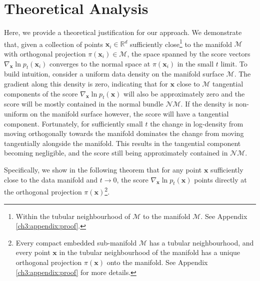 \section{Theoretical Analysis}
\label{ch3:sec:theory}

Here, we provide a theoretical justification for our approach. We demonstrate that, given a collection of points \(\textbf{x}_i \in \mathbb{R}^d\) sufficiently close\footnote{Within the tubular neighbourhood of \(\mathcal{M}\) to the manifold \(\mathcal{M}\). See Appendix \ref{ch3:appendix:proof}.} to the manifold \(\mathcal{M}\) with orthogonal projection \(\pi(\textbf{x}_i) \in \mathcal{M}\), the space spanned by the score vectors \(\nabla_{\textbf{x}} \ln p_t(\textbf{x}_i)\) converges to the normal space at \(\pi(\textbf{x}_i)\) in the small \(t\) limit. To build intuition, consider a uniform data density on the manifold surface $\mathcal{M}$. The gradient along this density is zero, indicating that for $\textbf{x}$ close to  $\mathcal{M}$ tangential components of the score $\nabla_\textbf{x} \ln p_t(\textbf{x})$ will also be approximately zero and the score  will be mostly contained in the normal bundle $\mathcal{NM}$. If the density is non-uniform on the manifold surface however, the score will have a tangential component. Fortunately, for sufficiently small $t$ the change in log-density from moving orthogonally towards the manifold  dominates the change from moving tangentially alongside the manifold. This results in the tangential component becoming negligible, and the score still being approximately contained in $\mathcal{NM}$.

Specifically, we show in the following theorem that for any point $\textbf{x}$ sufficiently close to the data manifold and $t\to 0$, the score $\nabla_\textbf{x} \ln p_t(\textbf{x})$ points directly at the orthogonal projection $\pi(\textbf{x})$\footnote{Every compact embedded sub-manifold $\mathcal{M}$ has a tubular neighbourhood, and every point $\textbf{x}$ in the tubular neighbourhood of the manifold has a unique orthogonal projection $\pi(\textbf{x})$ onto the manifold. See Appendix \ref{ch3:appendix:proof} for more details.}.


